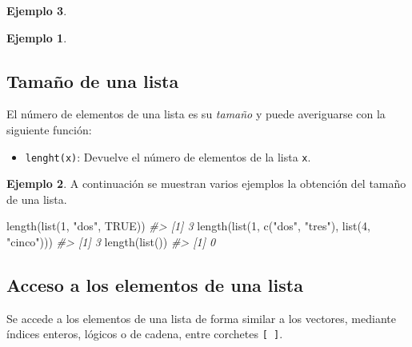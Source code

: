 \documentclass[
]{book}
\newenvironment{Shaded}{\begin{snugshade}}{\end{snugshade}}
\newcommand{\CommentTok}[1]{\textcolor[rgb]{0.56,0.35,0.01}{\textit{#1}}}
\newcommand{\ConstantTok}[1]{\textcolor[rgb]{0.00,0.00,0.00}{#1}}
\newcommand{\DecValTok}[1]{\textcolor[rgb]{0.00,0.00,0.81}{#1}}
\newcommand{\FunctionTok}[1]{\textcolor[rgb]{0.00,0.00,0.00}{#1}}
\newcommand{\NormalTok}[1]{#1}
\newcommand{\StringTok}[1]{\textcolor[rgb]{0.31,0.60,0.02}{#1}}
\providecommand{\tightlist}{%
  \setlength{\itemsep}{0pt}\setlength{\parskip}{0pt}}
\theoremstyle{definition}
\theoremstyle{definition}
\newtheorem{example}{Ejemplo}[chapter]
\theoremstyle{definition}
\theoremstyle{definition}
\theoremstyle{remark}
\begin{document}
\begin{example}
\begin{example}
\end{example}

\hypertarget{tamauxf1o-de-una-lista}{%
\subsection{Tamaño de una lista}\label{tamauxf1o-de-una-lista}}

El número de elementos de una lista es su \emph{tamaño} y puede averiguarse con la siguiente función:

\begin{itemize}
\tightlist
\item
  \texttt{lenght(x)}: Devuelve el número de elementos de la lista \texttt{x}.
\end{itemize}

\begin{example}

A continuación se muestran varios ejemplos la obtención del tamaño de una lista.

\begin{Shaded}
\begin{Highlighting}[]
\FunctionTok{length}\NormalTok{(}\FunctionTok{list}\NormalTok{(}\DecValTok{1}\NormalTok{, }\StringTok{"dos"}\NormalTok{, }\ConstantTok{TRUE}\NormalTok{))}
\CommentTok{\#\textgreater{} [1] 3}
\FunctionTok{length}\NormalTok{(}\FunctionTok{list}\NormalTok{(}\DecValTok{1}\NormalTok{, }\FunctionTok{c}\NormalTok{(}\StringTok{"dos"}\NormalTok{, }\StringTok{"tres"}\NormalTok{), }\FunctionTok{list}\NormalTok{(}\DecValTok{4}\NormalTok{, }\StringTok{"cinco"}\NormalTok{)))}
\CommentTok{\#\textgreater{} [1] 3}
\FunctionTok{length}\NormalTok{(}\FunctionTok{list}\NormalTok{())}
\CommentTok{\#\textgreater{} [1] 0}
\end{Highlighting}
\end{Shaded}

\end{example}

\hypertarget{acceso-a-los-elementos-de-una-lista}{%
\subsection{Acceso a los elementos de una lista}\label{acceso-a-los-elementos-de-una-lista}}

Se accede a los elementos de una lista de forma similar a los vectores, mediante índices enteros, lógicos o de cadena, entre corchetes \texttt{{[}\ {]}}.

\hypertarget{acceso-mediante-un-uxedndice-entero-1}{%
}
\end{example}
\end{document}

